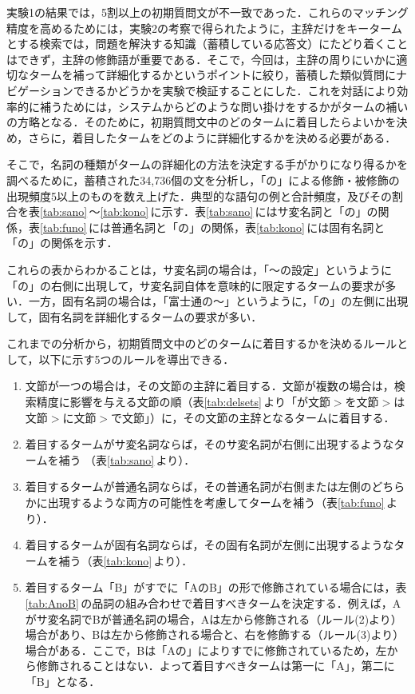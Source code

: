 実験1の結果では，5割以上の初期質問文が不一致であった．これらのマッチング精度を高めるためには，実験2の考察で得られたように，主辞だけをキータームとする検索では，問題を解決する知識（蓄積している応答文）にたどり着くことはできず，主辞の修飾語が重要である．そこで，今回は，主辞の周りにいかに適切なタームを補って詳細化するかというポイントに絞り，蓄積した類似質問にナビゲーションできるかどうかを実験で検証することにした．これを対話により効率的に補うためには，システムからどのような問い掛けをするかがタームの補いの方略となる．そのために，初期質問文中のどのタームに着目したらよいかを決め，さらに，着目したタームをどのように詳細化するかを決める必要がある． 

そこで，名詞の種類がタームの詳細化の方法を決定する手がかりになり得るかを調べるために，蓄積された34,736個の文を分析し，「の」による修飾・被修飾の出現頻度5以上のものを数え上げた．典型的な語句の例と合計頻度，及びその割合を表\ref{tab:sano}\,〜\ref{tab:kono}\,に示す．表\ref{tab:sano}\,にはサ変名詞と「の」の関係，表\ref{tab:funo}\,には普通名詞と「の」の関係，表\ref{tab:kono}\,には固有名詞と「の」の関係を示す．

これらの表からわかることは，サ変名詞の場合は，「〜の設定」というように「の」の右側に出現して，サ変名詞自体を意味的に限定するタームの要求が多い．一方，固有名詞の場合は，「富士通の〜」というように，「の」の左側に出現して，固有名詞を詳細化するタームの要求が多い．


これまでの分析から，初期質問文中のどのタームに着目するかを決めるルールとして，以下に示す5つのルールを導出できる．

\begin{enumerate}
 \item 文節が一つの場合は，その文節の主辞に着目する．文節が複数の場合は，検索精度に影響を与える文節の順（表\ref{tab:delsets}\,より「が文節$>$を文節$>$は文節$>$に文節$>$で文節」）に，その文節の主辞となるタームに着目する．
 \item 着目するタームがサ変名詞ならば，そのサ変名詞が右側に出現するようなタームを補う （表\ref{tab:sano}\,より）．
 \item 着目するタームが普通名詞ならば，その普通名詞が右側または左側のどちらかに出現するような両方の可能性を考慮してタームを補う（表\ref{tab:funo}\,より）．
 \item 着目するタームが固有名詞ならば，その固有名詞が左側に出現するようなタームを補う（表\ref{tab:kono}\,より）．
 \item 着目するターム「B」がすでに「AのB」の形で修飾されている場合には，表\ref{tab:AnoB}\,の品詞の組み合わせで着目すべきタームを決定する．例えば，Aがサ変名詞でBが普通名詞の場合，Aは左から修飾される（ルール(2)より）場合があり、Bは左から修飾される場合と、右を修飾する（ルール(3)より）場合がある．ここで，Bは「Aの」によりすでに修飾されているため，左から修飾されることはない．よって着目すべきタームは第一に「A」，第二に「B」となる． 
\end{enumerate}


